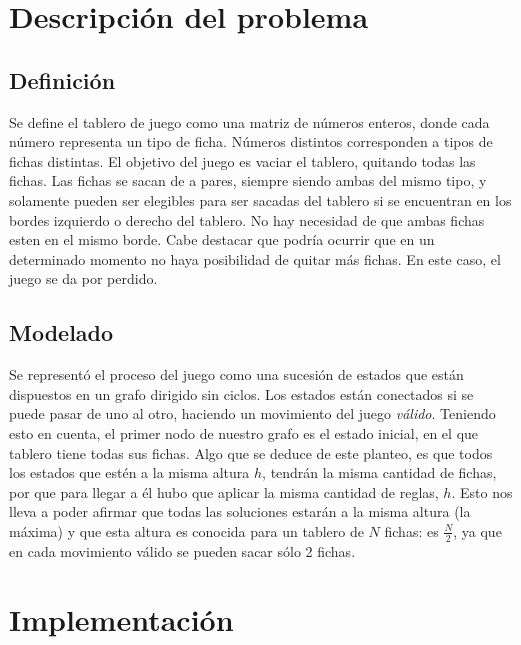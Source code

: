 \documentclass[a4paper,10pt]{article}
\begin{document}
\setcounter{page}{1}


\section{Descripción del problema}

    \subsection{Definición}


    Se define el tablero de juego como una matriz de números enteros, donde cada número representa un tipo de ficha. Números distintos corresponden a tipos de fichas distintas. 
    El objetivo del juego es vaciar el tablero, quitando todas las fichas. Las fichas se sacan de a pares, siempre siendo ambas del mismo tipo, y solamente pueden ser elegibles 
    para ser sacadas del tablero si se encuentran en los bordes izquierdo o derecho del tablero. No hay necesidad de que ambas fichas esten en el mismo borde. Cabe destacar 
    que podría ocurrir que en un determinado momento no haya posibilidad de quitar más fichas. En este caso, el juego se da por perdido.

    \subsection{Modelado}
    \label{problem-info}
    Se representó el proceso del juego como una sucesión de estados que están dispuestos en un grafo dirigido sin ciclos. Los estados están conectados si se puede pasar de uno 
    al otro, haciendo un movimiento del juego \textit{válido}. Teniendo esto en cuenta, el primer nodo de nuestro grafo es el estado inicial, en el que tablero tiene todas sus fichas. 
    Algo que se deduce de este planteo, es que todos los estados que estén a la misma altura $h$, tendrán la misma cantidad de fichas, por que para llegar a él hubo que aplicar 
    la misma cantidad de reglas, $h$. Esto nos lleva a poder afirmar que todas las soluciones estarán a la misma altura (la máxima) y que esta altura es conocida para un 
    tablero de $N$ fichas: es $\frac{N}{2}$, ya que en cada movimiento válido se pueden sacar sólo 2 fichas.

\section{Implementación}
\end{document}
